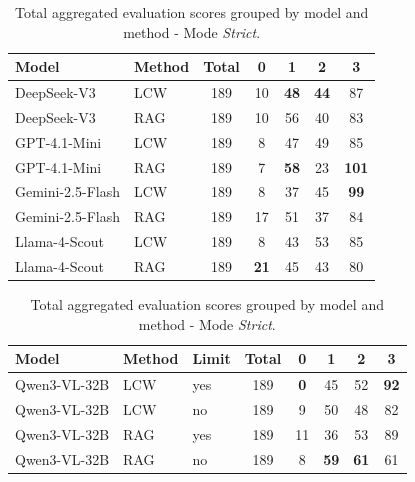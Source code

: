 \begin{table}[H]
    \centering
    \caption[Correctness - Answered - Total Numbers - \textit{Strict} Mode]{Total aggregated evaluation scores grouped by model and method - Mode \textit{Strict}.}
    \label{tab:total_strict_scores_answered}
    
    \begin{threeparttable}
        \small 
        \setlength{\tabcolsep}{8pt}
        \begin{tabular}{llccccc}
            \toprule
            \textbf{Model} & \textbf{Method} & \textbf{Total} & \textbf{0} & \textbf{1} & \textbf{2} & \textbf{3} \\
            \midrule
            DeepSeek-V3 & LCW & 189 & 10 & \textbf{48} & \textbf{44} & 87 \\
            \rowcolor{gray!10} DeepSeek-V3 & RAG & 189 & 10 & 56 & 40 & 83 \\
            \addlinespace
            GPT-4.1-Mini & LCW & 189 & 8 & 47 & 49 & 85 \\
            \rowcolor{gray!10} GPT-4.1-Mini & RAG & 189 & 7 & \textbf{58} & 23 & \textbf{101} \\
            \addlinespace
            Gemini-2.5-Flash & LCW & 189 & 8 & 37 & 45 & \textbf{99} \\
            \rowcolor{gray!10} Gemini-2.5-Flash & RAG & 189 & 17 & 51 & 37 & 84 \\
            \addlinespace
            Llama-4-Scout & LCW & 189 & 8 & 43 & 53 & 85 \\
            \rowcolor{gray!10} Llama-4-Scout & RAG & 189 & \textbf{21} & 45 & 43 & 80 \\
            \bottomrule
        \end{tabular}
    \end{threeparttable}
    
    \vspace{1.5em}
    
    \begin{threeparttable}
        \small
        \setlength{\tabcolsep}{8pt}
        \begin{tabular}{lllccccc}
            \toprule
            \textbf{Model} & \textbf{Method} & \textbf{Limit} & \textbf{Total} & \textbf{0} & \textbf{1} & \textbf{2} & \textbf{3} \\
            \midrule
            Qwen3-VL-32B & LCW & yes & 189 & \textbf{0} & 45 & 52 & \textbf{92} \\
            Qwen3-VL-32B & LCW & no & 189 & 9 & 50 & 48 & 82 \\
            \rowcolor{gray!10} Qwen3-VL-32B & RAG & yes & 189 & 11 & 36 & 53 & 89 \\
            \rowcolor{gray!10} Qwen3-VL-32B & RAG & no & 189 & 8 & \textbf{59} & \textbf{61} & 61 \\
            \bottomrule
        \end{tabular}
        

\end{threeparttable}
\end{table}
